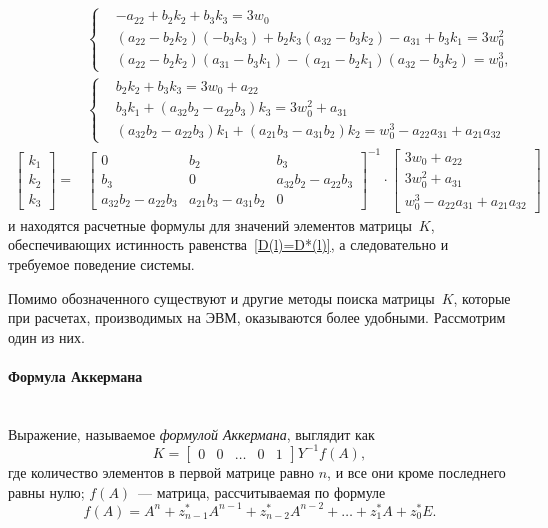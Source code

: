 \documentclass[12pt,a4paper,openany]{extarticle}
\begin{document}
\begin{align}
&\left\{
\begin{aligned}
	\!&-a_{22} + b_2k_2 +b_3k_3 = 3w_0 \\
	\!&(a_{22}-b_2k_2)(-b_3k_3)+b_2k_3(a_{32}-b_3k_2)-a_{31} + b_3k_1 = 3w_0^2\\
	\!&(a_{22}-b_2k_2)(a_{31}-b_3k_1)-(a_{21}-b_2k_1)(a_{32}-b_3k_2) = w_0^3,
\end{aligned}
\right.\\
%
&\left\{
\begin{aligned}
	\!&b_2k_2 + b_3k_3 = 3w_0 + a_{22}\\
	\!&b_3k_1 + (a_{32}b_2-a_{22}b_3)k_3 = 3w_0^2+a_{31}\\
	\!&(a_{32}b_2-a_{22}b_3)k_1 + (a_{21}b_3-a_{31}b_2)k_2 = w_0^3-a_{22}a_{31}+a_{21}a_{32}
\end{aligned}
\right.\\
%
\begin{bmatrix}
k_1 \\ k_2 \\ k_3
\end{bmatrix}
=
&\begin{bmatrix}
0                   & b_2                 & b_3\\
b_3                 & 0                   & a_{32}b_2-a_{22}b_3\\
a_{32}b_2-a_{22}b_3 & a_{21}b_3-a_{31}b_2 & 0
\end{bmatrix}^{-1}
\!\!\cdot
\begin{bmatrix}
3w_0+a_{22} \\ 3w_0^2+a_{31} \\ w_0^3-a_{22}a_{31}+a_{21}a_{32}
\end{bmatrix}
\end{align}
и находятся расчетные формулы для значений элементов матрицы~$K$, обеспечивающих истинность равенства~\eqref{D(l)=D*(l)}, а следовательно и требуемое поведение системы.

Помимо обозначенного существуют и другие методы поиска матрицы~$K$, которые при расчетах, производимых на ЭВМ, оказываются более удобными.
Рассмотрим один из них.

\paragraph*{Формула Аккермана}$\phantom{-}$\\
\hspace*{\parindent}Выражение, называемое \textit{формулой Аккермана}, выглядит как
\begin{equation}
	K = 
	\begin{bmatrix}
		0 & 0 & \dots & 0 & 1
	\end{bmatrix}	
	Y^{-1}f(A),
\end{equation}
где количество элементов в первой матрице равно $n$, и все они кроме последнего равны нулю; $f(A)$~--- матрица, рассчитываемая по формуле
\begin{equation}
	f(A) = A^n + z_{n-1}^*A^{n-1} + z_{n-2}^*A^{n-2} + \dots + z_1^*A + z_0^*E.
\end{equation}
\end{document}
